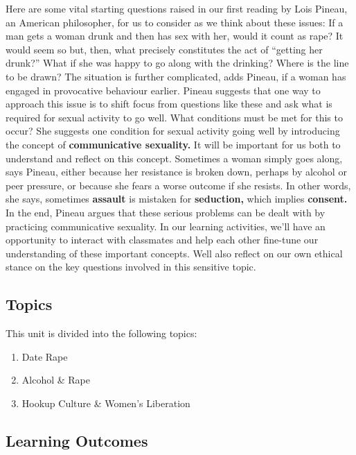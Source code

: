 \documentclass[
]{book}
\providecommand{\tightlist}{%
  \setlength{\itemsep}{0pt}\setlength{\parskip}{0pt}}
\begin{document}
Here are some vital starting questions raised in our first reading by Lois Pineau, an American philosopher, for us to consider as we think about these issues: If a man gets a woman drunk and then has sex with her, would it count as rape? It would seem so but, then, what precisely constitutes the act of ``getting her drunk?'' What if she was happy to go along with the drinking? Where is the line to be drawn? The situation is further complicated, adds Pineau, if a woman has engaged in provocative behaviour earlier. Pineau suggests that one way to approach this issue is to shift focus from questions like these and ask what is required for sexual activity to go well. What conditions must be met for this to occur? She suggests one condition for sexual activity going well by introducing the concept of \textbf{communicative sexuality.} It will be important for us both to understand and reflect on this concept. Sometimes a woman simply goes along, says Pineau, either because her resistance is broken down, perhaps by alcohol or peer pressure, or because she fears a worse outcome if she resists. In other words, she says, sometimes \textbf{assault} is mistaken for \textbf{seduction,} which implies \textbf{consent.} In the end, Pineau argues that these serious problems can be dealt with by practicing communicative sexuality. In our learning activities, we'll have an opportunity to interact with classmates and help each other fine-tune our understanding of these important concepts. Well also reflect on our own ethical stance on the key questions involved in this sensitive topic.

\hypertarget{topics-3}{%
\subsection*{Topics}\label{topics-3}}

This unit is divided into the following topics:

\begin{enumerate}
\def\labelenumi{\arabic{enumi}.}
\tightlist
\item
  Date Rape
\item
  Alcohol \& Rape
\item
  Hookup Culture \& Women's Liberation
\end{enumerate}

\hypertarget{learning-outcomes-3}{%
\subsection*{Learning Outcomes}\label{learning-outcomes-3}}
\end{document}
